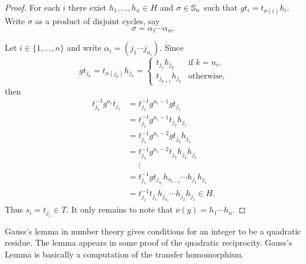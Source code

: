 \begin{proof}
	For each $i$ there exist $h_1,\dots,h_n\in H$ and $\sigma\in\mathbb{S}_n$ such that 
	$gt_i=t_{\sigma(i)}h_i$. Write $\sigma$ as a product of disjoint cycles, say 
	\[
		\sigma=\alpha_1\cdots\alpha_m.
	\]

	Let $i\in\{1,\dots,n\}$ and write 
	$\alpha_i=(j_{1}\cdots j_{n_i})$. Since   
	\[
		g t_{j_k}=t_{\sigma(j_k)}h_{j_k}=\begin{cases}
			t_{j_1}h_{j_k} & \text{if $k=n_i$},\\
			t_{j_{k+1}}h_{j_k} & \text{otherwise},
		\end{cases}
	\]
	then 
	\begin{align*}
	t_{j_1}^{-1}g^{n_i}t_{j_1}
	&=t_{j_1}^{-1}g^{n_i-1}gt_{j_1}\\
	&=t_{j_1}^{-1}g^{n_i-1}t_{j_2}h_{j_1}\\
	&=t_{j_1}^{-1}g^{n_i-2}gt_{j_2}h_{j_1}\\
	&=t_{j_1}^{-1}g^{n_i-2}t_{j_3}h_{j_2}h_{j_1}\\
	&\phantom{=}\vdots\\
	&=t_{j_1}^{-1}gt_{j_{n_i}}h_{n_{i-1}}\cdots h_{j_2}h_{j_1}\\
	&=t_{j_1}^{-1}t_{j_1}h_{j_{n_i}}\cdots h_{j_2}h_{j_1}\in H. 	
	\end{align*}
	Thus $s_i=t_{j_1}\in T$. It only remains to note that $\nu(g)=h_1\cdots h_n$. 
\end{proof}


Gauss's lemma in number theory gives conditions for an integer to be a quadratic residue. The lemma appears in some proof of the quadratic reciprocity. Gauss's Lemma is basically a computation of the transfer homomorphism. 

